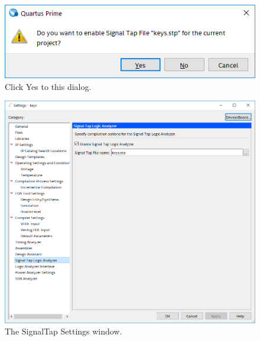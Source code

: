 \documentclass[11pt, twoside, pdftex]{article}
\begin{document}
\begin{enumerate}
\begin{figure}[H]
   \begin{center}
      \includegraphics[scale=0.65]{figures/figure6.png}
   \caption{Click {\sf Yes} to this dialog.} 
	 \label{fig:6}
	 \end{center}
\end{figure}

\begin{figure}[H]
   \begin{center}
      \includegraphics[scale=0.6]{figures/figure7.png}
   \caption{The SignalTap Settings window.} 
	 \label{fig:7}
	 \end{center}
\end{figure}


\end{enumerate}
\end{document}
